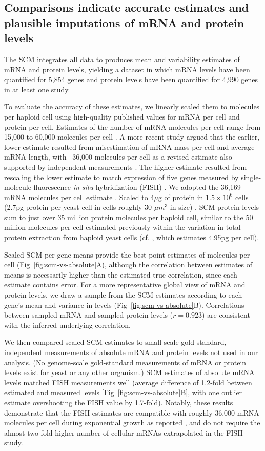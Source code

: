 \documentclass[10pt]{article}
\begin{document}
\subsection*{Comparisons indicate accurate estimates and plausible imputations of mRNA and protein levels}

The SCM integrates all data to produces mean and variability estimates of mRNA and protein
levels, yielding a dataset in which mRNA levels have been quantified for 5,854 genes and protein levels have been quantified for 4,990 genes in at least one study.

To evaluate the accuracy of these estimates, we linearly scaled them to molecules per haploid
cell using high-quality published values for mRNA per cell and protein per cell. Estimates of the number of mRNA molecules per
cell range from 15,000 to 60,000 molecules per cell \cite{holstege98,zenklusen08}. A more recent study argued that the earlier, lower estimate resulted from misestimation of mRNA mass per cell and average mRNA length, with ~36,000 molecules per cell as a revised estimate also supported by independent measurements \cite{miura08}. The higher estimate resulted from rescaling the lower estimate to match expression of five genes measured by single-molecule fluorescence \textit{in situ} hybridization (FISH) \cite{zenklusen08}. We adopted the 36,169 mRNA molecules per cell estimate
\cite{miura08}. Scaled to 4$\mu$g of protein in $1.5\times10^6$ cells (2.7pg protein per yeast cell in cells roughly 30 $\mu m^3$ in size)
\cite{Johnston1977}, SCM protein levels sum to just over 35 million protein molecules per haploid cell, similar to the 50 million molecules per cell estimated previously \cite{futcher99} within the variation in total protein extraction from haploid yeast cells (cf. \cite{vonderhaar02}, which estimates 4.95pg per cell).

Scaled SCM per-gene means provide the best point-estimates of molecules per cell (Fig~\ref{fig:scm-vs-absolute}A), although the correlation between estimates of means is necessarily higher than the estimated true correlation, since each estimate contains error. For a more representative global view of mRNA and protein levels, we draw a sample from the SCM estimates according to each gene's mean and variance in levels (Fig~\ref{fig:scm-vs-absolute}B). Correlations between sampled mRNA and sampled protein levels ($r=0.923$) are consistent with the inferred underlying correlation.

We then compared scaled SCM estimates to small-scale gold-standard, 
independent measurements of absolute mRNA and protein levels not used in our
analysis. (No genome-scale gold-standard measurements of mRNA
or protein levels exist for yeast or any other organism.) SCM estimates of absolute mRNA levels matched
FISH measurements well \cite{zenklusen08} (average difference of 1.2-fold between estimated and
measured levels [Fig~\ref{fig:scm-vs-absolute}B], with one outlier estimate overshooting the FISH value by 1.7-fold). Notably, these results demonstrate that the FISH estimates are compatible with roughly 36,000 mRNA molecules per cell during exponential growth as reported \cite{miura08}, and do not require the almost two-fold higher number of cellular mRNAs extrapolated in the FISH study.
\end{document}
